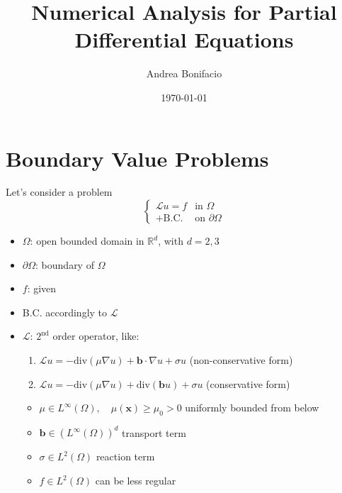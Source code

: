 \documentclass[a4paper,12pt]{article}
\theoremstyle{break}
\renewcommand*{\grad}{\nabla}
\renewcommand*{\div}{\text{div}}
\newcommand{\vect}[1]{\textbf{#1}}
\renewcommand{\real}{\mathbb{R}}
\numberwithin{equation}{section}
\begin{document}
\title{Numerical Analysis for Partial Differential Equations}
\author{Andrea Bonifacio}
\date{\today}
\maketitle
\newpage
\section{Boundary Value Problems}
Let's consider a problem 
\begin{equation}
    \begin{cases}
        \mathcal{L}u = f & \text{in }\Omega \\
        + \text{B.C.} & \text{on }\partial\Omega
    \end{cases}
\end{equation}
\begin{itemize}
    \item \(\Omega\): open bounded domain in \(\real^d\), with \(d = 2,3\)
    \item \(\partial\Omega\): boundary of \(\Omega\)
    \item \(f\): given 
    \item B.C. accordingly to \(\mathcal{L}\)
    \item \(\mathcal{L}\): \(2^{\text{nd}}\) order operator, like:
    \begin{enumerate}
        \item \(\mathcal{L}u = -\div(\mu\grad u) +\vect{b}\cdot\grad u + \sigma u\) {\hspace*{\fill} (non-conservative form)}
        \item \(\mathcal{L}u = -\div(\mu \grad u) + \div(\vect{b}u) + \sigma u\) {\hspace*{\fill} (conservative form)}
    \end{enumerate}
    \begin{itemize}
        \item \(\mu \in L^\infty(\Omega), \quad \mu(\vect{x})\geq \mu_0 > 0\) {\hspace*{\fill} uniformly bounded from below}
        \item \(\vect{b} \in (L^\infty(\Omega))^d\) {\hspace*{\fill} transport term}
        \item \(\sigma \in L^2(\Omega)\) {\hspace*{\fill} reaction term}
        \item \(f \in L^2(\Omega)\) {\hspace*{\fill} can be less regular}
    \end{itemize}
\end{itemize}
\end{document}

